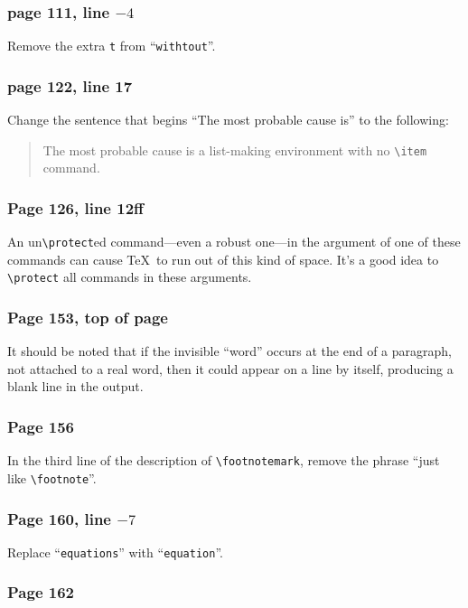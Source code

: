 \subsubsection*{page 111, line $-4$}
Remove the extra {\tt t} from ``{\tt withtout}''.

\subsubsection*{page 122, line 17}
Change the sentence that begins ``The most probable cause is'' to
the following:
\begin{quote}
The most probable cause is a list-making environment with no
\verb|\item| command.
\end{quote}


\subsubsection*{Page 126, line 12ff}
An un\verb|\protect|ed command---even a robust one---in the argument
of one of these commands can cause \TeX\ to run out of this kind of
space.  It's a good idea to \verb|\protect| all commands in
these arguments.


\subsubsection*{Page 153, top of page}
It should be noted that if the invisible ``word'' occurs at the end
of a paragraph, not attached to a real word, then it could appear
on a line by itself, producing a blank line in the output.

\subsubsection*{Page 156}
In the third line of the description of \verb|\footnotemark|, 
remove the phrase ``just like \verb|\footnote|''.

\subsubsection*{Page 160, line $-7$}
Replace ``{\tt equations}'' with ``{\tt equation}''.

\subsubsection*{Page 162}

